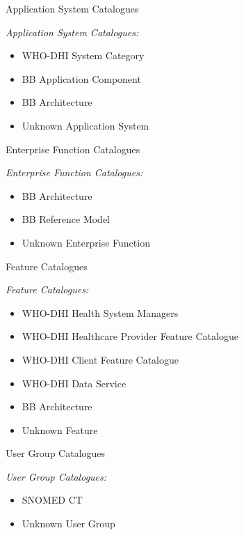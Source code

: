 \documentclass[aspectratio=1610,12pt]{beamer}
\begin{document}
\begin{frame}{Application System Catalogues}
\begin{spacing}{1.25}
  \emph{Application System Catalogues:}
  \begin{itemize}
    \item WHO-DHI System Category
    \item BB Application Component
    \item BB Architecture
    \item Unknown Application System
  \end{itemize}
\end{spacing}
\end{frame}

\begin{frame}{Enterprise Function Catalogues}
\begin{spacing}{1.25}
  \emph{Enterprise Function Catalogues:}
  \begin{itemize}
    \item BB Architecture
    \item BB Reference Model
    \item Unknown Enterprise Function
  \end{itemize}
  \end{spacing}
\end{frame}

\begin{frame}{Feature Catalogues}
\begin{spacing}{1.25}
  \emph{Feature Catalogues:}
  \begin{itemize}
    \item WHO-DHI Health System Managers
    \item WHO-DHI Healthcare Provider Feature Catalogue
    \item WHO-DHI Client Feature Catalogue
    \item WHO-DHI Data Service
    \item BB Architecture
    \item Unknown Feature
  \end{itemize}
  \end{spacing}
\end{frame}

\begin{frame}{User Group Catalogues}
\begin{spacing}{1.25}
  \emph{User Group Catalogues:}
  \begin{itemize}
    \item SNOMED CT
    \item Unknown User Group
  \end{itemize}
  \end{spacing}
\end{frame}
\end{document}
